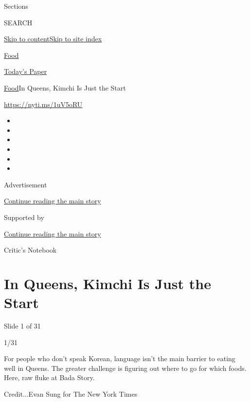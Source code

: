 Sections

SEARCH

\protect\hyperlink{site-content}{Skip to
content}\protect\hyperlink{site-index}{Skip to site index}

\href{https://www.nytimes3xbfgragh.onion/section/food}{Food}

\href{https://myaccount.nytimes3xbfgragh.onion/auth/login?response_type=cookie\&client_id=vi}{}

\href{https://www.nytimes3xbfgragh.onion/section/todayspaper}{Today's
Paper}

\href{/section/food}{Food}\textbar{}In Queens, Kimchi Is Just the Start

\url{https://nyti.ms/1uV5oRU}

\begin{itemize}
\item
\item
\item
\item
\item
\item
\end{itemize}

Advertisement

\protect\hyperlink{after-top}{Continue reading the main story}

Supported by

\protect\hyperlink{after-sponsor}{Continue reading the main story}

Critic's Notebook

\hypertarget{in-queens-kimchi-is-just-the-start}{%
\section{In Queens, Kimchi Is Just the
Start}\label{in-queens-kimchi-is-just-the-start}}

Slide 1 of 31

1/31

For people who don't speak Korean, language isn't the main barrier to
eating well in Queens. The greater challenge is figuring out where to go
for which foods. Here, raw fluke at Bada Story.

Credit...Evan Sung for The New York Times

